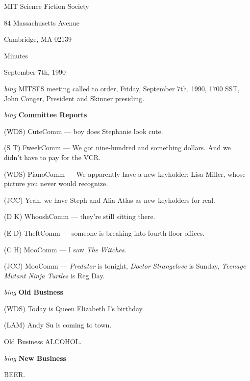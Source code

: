 \setlength{\topmargin}{-0.5in}
\setlength{\oddsidemargin}{0.0in}
\setlength{\evensidemargin}{0.0in}
\setlength{\textheight}{9in}
\setlength{\textwidth}{6.5in}



\begin{center}
MIT Science Fiction Society

84 Massachusetts Avenue

Cambridge, MA 02139

\vspace{0.2in}
Minutes

September 7th, 1990

\end{center}
 
\vspace{0.15in}
{\em bing\/}  MITSFS meeting called to order, Friday, September 7th, 1990,
1700 SST, John Conger, President and Skinner presiding.

\vspace{0.15in}
{\em bing\/} {\bf Committee Reports\/}

(WDS) CuteComm --- boy does Stephanie look cute.

(S T) FweekComm --- We got nine-hundred and something dollars.  And we didn't
have to pay for the VCR.

(WDS) PianoComm --- We apparently have a new keyholder: Lisa Miller, whose
picture you never would recognize.

(JCC) Yeah, we have Steph and Alia Atlas as new keyholders for real.

(D K) WhooshComm --- they're still sitting there.

(E D) TheftComm --- someone is breaking into fourth floor offices.

(C H) MooComm --- I saw {\em The Witches\/}.

(JCC) MooComm --- {\em Predator\/} is tonight, {\em Doctor Strangelove\/} is
Sunday, {\em Teenage Mutant Ninja Turtles\/} is Reg Day.

\vspace{.15in}
{\em bing\/} {\bf Old Business\/}

(WDS) Today is Queen Elizabeth I's birthday.

(LAM) Andy Su is coming to town.

Old Business ALCOHOL.

\vspace{0.15in}
{\em bing\/} {\bf New Business\/}

BEER.

